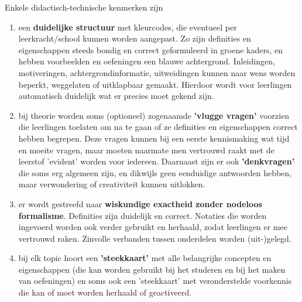 \documentclass{ximera}
\begin{document}
    Enkele didactisch-technische kenmerken zijn
    \begin{enumerate}
        \item een \textbf{duidelijke structuur} met kleurcodes, die eventueel per leerkracht/school kunnen worden aangepast. Zo zijn definities en eigenschappen steeds bondig en correct geformuleerd in groene kaders, en hebben voorbeelden en oefeningen een blauwe achtergrond. Inleidingen, motiveringen, achtergrondinformatie, uitweidingen kunnen naar wens worden beperkt, weggelaten of uitklapbaar gemaakt. Hierdoor wordt voor leerlingen automatisch duidelijk wat er precies moet gekend zijn.
        \item bij theorie worden soms (optioneel) zogenaamde \textbf{'vlugge vragen'} voorzien die leerlingen toelaten om na te gaan of ze definities en eigenschappen correct hebben begrepen. Deze vragen kunnen bij een eerste kennismaking wat tijd en moeite vragen, maar moeten naarmate men vertrouwd raakt met de leerstof 'evident' worden voor iedereen. Daarnaast zijn er ook \textbf{'denkvragen'} die soms erg algemeen zijn, en dikwijls geen eenduidige antwoorden hebben, maar verwondering of creativiteit kunnen uitlokken.
        \item er wordt gestreefd naar \textbf{wiskundige exactheid zonder nodeloos formalisme}. Definities zijn duidelijk en correct. Notaties die worden ingevoerd worden ook verder gebruikt en herhaald, zodat leerlingen er mee vertrouwd raken. Zinvolle verbanden tussen onderdelen worden (uit-)gelegd.
        \item bij elk topic hoort een \textbf{'steekkaart'} met alle belangrijke concepten en eigenschappen (die kan worden gebruikt bij het studeren en bij het maken van oefeningen)
        en soms ook  een 'steekkaart' met veronderstelde voorkennis die kan of moet worden herhaald of geactiveerd. 
    \end{enumerate}
\end{document}
